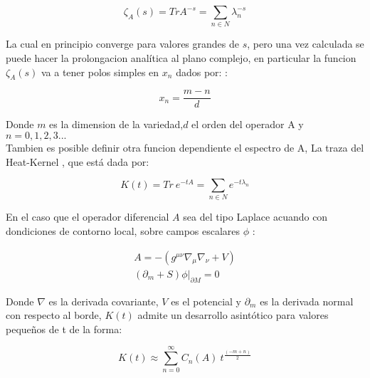 \begin{equation}
\zeta _A (s) = Tr A ^{-s} = \sum _{n \in N}  \lambda _n ^{-s}
\label{funcion.zeta}
\end{equation}

La cual en principio converge para valores grandes de $s$, pero una vez calculada se puede hacer la prolongacion analítica al plano complejo, en particular la funcion $\zeta _A (s)$ va a tener polos simples en $x _n$ dados por:   :

\begin{equation}
x _n = \frac{m-n}{d} 
\label{eq.ceros.zeta}
\end{equation}

Donde $m$ es la dimension de la variedad,$d$ el orden del operador A y $n= 0,1,2,3 ...$ \\

Tambien es posible definir otra funcion dependiente el espectro de A, La traza del Heat-Kernel \cite{VASSILEVICH2003279}, que está dada por:

\begin{equation}
K (t) =  Tr \ e ^{-t A} = 
\sum _{n  \in N} e ^{-t \lambda _{n} }
\end{equation}

En el caso que el operador diferencial $A$ sea del tipo Laplace acuando con dondiciones de contorno local, sobre campos escalares $\phi $ :

\begin{equation}
\begin{array}{c}

A = - \left(
			g ^{\mu \nu} \nabla _{\mu} \nabla _{\nu} + V
			\right) \\
\left (\partial _m + S \right) \phi | _{\partial M} = 0

			

\end{array}
\end{equation}

Donde $\nabla$ es la derivada covariante, $V$ es el potencial y $\partial _m$ es la derivada normal con respecto al borde, $K(t)$ admite un desarrollo asintótico para valores pequeños de t  de la forma:

\begin{equation}
K(t) \approx 
\sum _{n=0} ^{\infty}
C _n (A) \ 
t ^{\frac{(-m+n)}{2}}
\label{eq.heat.expansion}
\end{equation}



